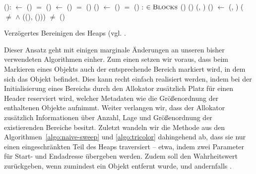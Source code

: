 \begin{algorithm}[h]
\begin{algorithmic}[1]
	\State {}():
	\State \quad {} $\gets$ ()
	\State \quad \IF {} $=$ \Null
	\State \quad \quad {}()	
	\State \quad \quad {} $\gets$ ()	
	\State \quad \quad \IF {} $=$ \Null
	\State \quad \quad \quad {}()		
	\State \quad \quad \quad {}()	
	\State \quad \quad \quad {} $\gets$ ()	
	\State \quad \quad \quad \IF {} $=$ \Null
	\State \quad \quad \quad \quad {}()
	\State \quad \Return {}
	\Statex
	\State {}:
	\State \quad {}		
	\State \quad \FOREACH {} $\in \textsc{Blocks}$
	\State \quad \quad \IF {}()
	\State \quad \quad \quad {}()	
	\State \quad \quad \ELSE {}(, )
	\Statex
	\State {}()
	\State \quad \Do
	\State \quad \quad {} $\gets$ (, )
	\State \quad \quad \IF ( $\neq$ \Null $\wedge$ ((), ()))
	\State \quad \quad \quad \Return	{}
	\State \quad \WHILE {} $\neq$ 
	\State \quad {}()	
\end{algorithmic}
\caption[Verzögertes Bereinigen des Heaps]{Verzögertes Bereinigen des Heaps (vgl. \cite[S. 25]{handbook}.}
\label{algo:lazy-sweep}
\end{algorithm}

Dieser Ansatz geht mit einigen marginale Änderungen an unseren bisher verwendeten Algorithmen einher.
Zum einen setzen wir voraus, dass beim Markieren eines Objekts auch der entsprechende Bereich markiert wird, in dem sich das Objekt befindet.
Dies kann recht einfach realisiert werden, indem bei der Initialisierung eines Bereichs durch den Allokator zusätzlich Platz für einen Header reserviert wird, welcher Metadaten wie die Größenordnung der enthaltenen Objekte aufnimmt.
Weiter verlangen wir, dass der Allokator zusätzlich Informationen über Anzahl, Lage und Größenordnung der existierenden Bereiche besitzt.
Zuletzt wandeln wir die Methode  aus den Algorithmen~\ref{algo:naive-sweep} und \ref{algo:tricolor} dahingehend ab, dass sie nur einen eingeschränkten Teil des Heaps traversiert -- etwa, indem zwei Parameter für Start- und Endadresse übergeben werden.
Zudem soll  den Wahrheitswert  zurückgeben, wenn zumindest ein Objekt entfernt wurde, und andernfalls .

